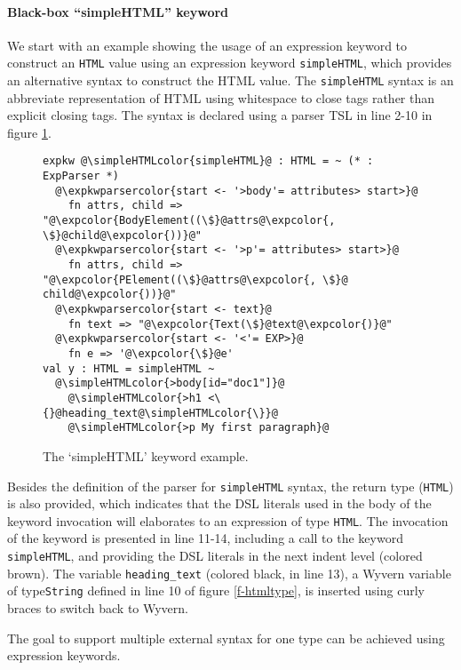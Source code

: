 \documentclass{sig-alternate}
\newcommand{\expkwparsercolor}[1]{\textcolor[HTML]{336699}{#1}}
\newcommand{\expcolor}[1]{\textcolor[HTML]{FF0033}{#1}}
\newcommand{\simpleHTMLcolor}[1]{\textcolor[HTML]{7D5100}{#1}}
\newcommand{\mycaption}[1]{\vspace{-4px}\caption{#1}\vspace{-2px}}
\begin{document}
\paragraph{Black-box ``simpleHTML'' keyword}
We start with an example showing the usage of an expression keyword to construct an \verb|HTML| value using an expression keyword \verb|simpleHTML|, which provides an alternative syntax to construct the HTML value. The \verb|simpleHTML| syntax is an abbreviate representation of HTML using whitespace to close tags rather than explicit closing tags. The syntax is declared using a parser TSL in line 2-10 in figure \ref{f-simplehtml}.
\begin{figure}[ht]
\begin{lstlisting}[style=wyvern]
expkw @\simpleHTMLcolor{simpleHTML}@ : HTML = ~ (* : ExpParser *)
  @\expkwparsercolor{start <- '>body'= attributes> start>}@
    fn attrs, child => "@\expcolor{BodyElement((\$}@attrs@\expcolor{, \$}@child@\expcolor{))}@"
  @\expkwparsercolor{start <- '>p'= attributes> start>}@
    fn attrs, child => "@\expcolor{PElement((\$}@attrs@\expcolor{, \$}@ child@\expcolor{))}@"
  @\expkwparsercolor{start <- text}@
    fn text => "@\expcolor{Text(\$}@text@\expcolor{)}@"
  @\expkwparsercolor{start <- '<'= EXP>}@
    fn e => '@\expcolor{\$}@e'
val y : HTML = simpleHTML ~
  @\simpleHTMLcolor{>body[id="doc1"]}@
    @\simpleHTMLcolor{>h1 <\{}@heading_text@\simpleHTMLcolor{\}}@
    @\simpleHTMLcolor{>p My first paragraph}@
\end{lstlisting}
\mycaption{The `simpleHTML' keyword example.\todo{set uniform spacing for whole document}}
\label{f-simplehtml}
\end{figure}

Besides the definition of the parser for \verb|simpleHTML| syntax, the return type (\verb|HTML|) is also provided, which indicates that the DSL literals used in the body of the keyword invocation will elaborates to an expression of type \verb|HTML|. The invocation of the keyword is presented in line 11-14, including a call to the keyword \verb|simpleHTML|, and providing the DSL literals in the next indent level (colored brown). The variable \verb|heading_text| (colored black, in line 13), a Wyvern variable of type\verb|String| defined in line 10 of figure \ref{f-htmltype}, is inserted using curly braces to switch back to Wyvern.

The goal to support multiple external syntax for one type can be achieved using expression keywords.
\end{document}
